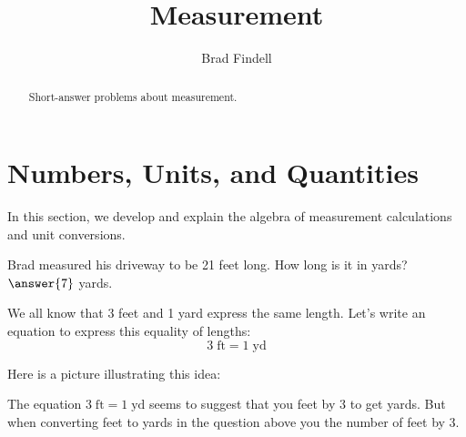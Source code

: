 \documentclass[nooutcomes]{ximera}
\title{Measurement}
\author{Brad Findell}
\begin{document}
\begin{abstract}
Short-answer problems about measurement. 
\end{abstract}
\maketitle




\section{Numbers, Units, and Quantities}
In this section, we develop and explain the algebra of measurement calculations and unit conversions. 

\begin{question}
Brad measured his driveway to be 21 feet long.  How long is it in yards?  
$\answer{7}$ yards.  
\end{question}

We all know that 3 feet and 1 yard express the same length.  Let's write an equation to express this equality of lengths: 
\[
3\;\textrm{ft} = 1\;\textrm{yd}
\]

Here is a picture illustrating this idea:  

\begin{image}
\end{image}

The equation $3\;\textrm{ft} = 1\;\textrm{yd}$ seems to suggest that you  feet by 3 to get yards.  But when converting feet to yards in the question above you  the number of feet by 3.  
\end{document}
